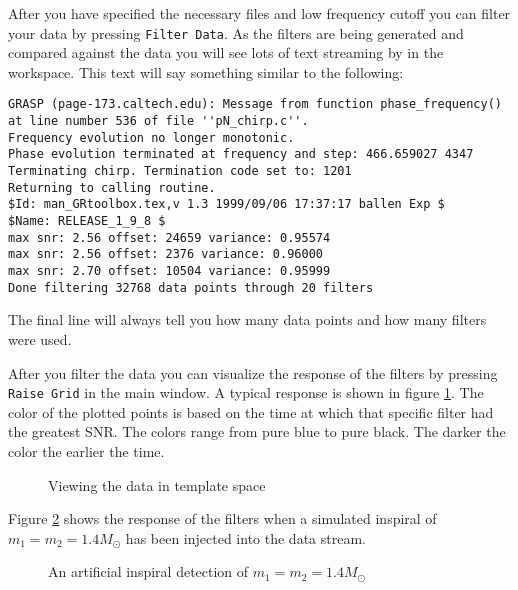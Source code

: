 After you have specified the necessary files and low frequency cutoff you can
filter your data by pressing \texttt{Filter Data}. As the filters are being
generated and compared against the data you will see lots of text streaming by
in the workspace. This text will say something similar to the following:
\begin{verbatim}
GRASP (page-173.caltech.edu): Message from function phase_frequency() 
at line number 536 of file ''pN_chirp.c''.
Frequency evolution no longer monotonic.
Phase evolution terminated at frequency and step: 466.659027 4347
Terminating chirp. Termination code set to: 1201
Returning to calling routine.
$Id: man_GRtoolbox.tex,v 1.3 1999/09/06 17:37:17 ballen Exp $
$Name: RELEASE_1_9_8 $
max snr: 2.56 offset: 24659 variance: 0.95574
max snr: 2.56 offset: 2376 variance: 0.96000
max snr: 2.70 offset: 10504 variance: 0.95999
Done filtering 32768 data points through 20 filters
\end{verbatim}
The final line will always tell you how many data points and how many filters
were used.

After you filter the data you can visualize the response of the filters by
pressing \texttt{Raise Grid} in the main window. A typical response is shown
in figure \ref{f:filter_response}. The color of the plotted points is based on
the time at which that specific filter had the greatest SNR. The colors range
from pure blue to pure black. The darker the color the earlier the time.

\begin{figure}[h]
\begin{center}
\caption{ \label{f:filter_response}
Viewing the data in template space}
\end{center}
\end{figure}

Figure \ref{f:filter_response_inject} shows the response of the filters when a
simulated inspiral of $m_{1}=m_{2}=1.4M_{\odot}$ has been injected into the
data stream.
\begin{figure}[h]
\begin{center}
\caption{ \label{f:filter_response_inject}
An artificial inspiral detection of $m_{1}=m_{2}=1.4M_{\odot}$}
\end{center}
\end{figure}

